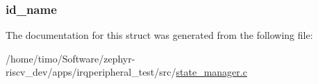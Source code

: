 \subsubsection[{\texorpdfstring{id\+\_\+name}{id_name}}]{ id\+\_\+name}\hypertarget{struct_s_m_event_a20f4c1f646da07c42e0e23c9f5dc5c30}{}\label{struct_s_m_event_a20f4c1f646da07c42e0e23c9f5dc5c30}


The documentation for this struct was generated from the following file\+:\begin{DoxyCompactItemize}
\item 
/home/timo/\+Software/zephyr-\/riscv\+\_\+dev/apps/irqperipheral\+\_\+test/src/\hyperlink{state__manager_8c}{state\+\_\+manager.\+c}\end{DoxyCompactItemize}
